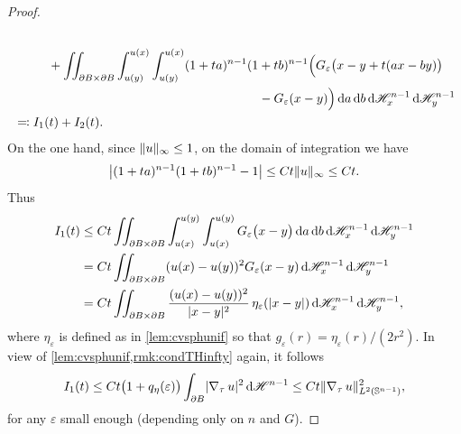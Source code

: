 \documentclass[JEP,XML,SOM,Unicode,published]{cedram}
\numberwithin{equation}{section}
\theoremstyle{plain}
\theoremstyle{definition}
\newcommand{\da}{\mathop{}\mathopen{}\mathrm{d}a}
\newcommand{\db}{\mathop{}\mathopen{}\mathrm{d}b}
\newcommand{\dH}{\mathop{}\mathopen{}\mathrm{d}\mathscr{H}}
\newcommand{\bbS}{\mathbb{S}}
\let\eps\varepsilon
\newcommand{\grad}{\nabla}
\DeclarePairedDelimiter{\abs}{\lvert}{\rvert}
\DeclarePairedDelimiter{\norm}{\lVert}{\rVert}
\begin{document}
\begin{proof}
\begin{multline}
\begin{aligned}
\begin{multlined}
\end{multlined}\\
&\begin{multlined}\hphantom{=\iint}
+\iint_{\partial B\times\partial B} \int_{u(y)}^{u(x)}\int_{u(y)}^{u(x)}
(1+ta)^{n-1}(1+tb)^{n-1}\Big(G_\eps\big(x-y+t(ax-by)\big)\\-G_\eps(x-y)\Big)
\da\db\dH^{n-1}_x\dH^{n-1}_y\end{multlined}\\
&\eqqcolon I_1(t)+I_2(t).
\end{aligned}
\end{multline}
On the one hand, since $\norm{u}_\infty\leq 1$, on the domain of integration we have
\[
\abs*{(1+ta)^{n-1}(1+tb)^{n-1}-1}
\leq Ct\norm{u}_{\infty}
\leq Ct.
\]
Thus
\[
\begin{aligned}
I_1(t)
&\leq Ct\iint_{\partial B\times\partial B} \int_{u(x)}^{u(y)}\int_{u(x)}^{u(y)}
G_\eps\big(x-y\big)\da\db\dH_x^{n-1}\dH_y^{n-1}\\
&= Ct\iint_{\partial B\times\partial B} (u(x)-u(y))^2 G_{\eps}(x-y)\dH_x^{n-1}\dH_y^{n-1}\\
&= Ct\iint_{\partial B\times\partial B} \frac{(u(x)-u(y))^2}{\abs{x-y}^2}\,
\eta_{\eps}(\abs{x-y})\dH_x^{n-1}\dH_y^{n-1},
\end{aligned}
\]
where $\eta_\eps$ is defined as in \cref{lem:cvsphunif} so that
$g_\eps(r)=\eta_\eps(r)/(2r^2)$.
In view of \cref{lem:cvsphunif,rmk:condTHinfty} again, it follows
\begin{equation}\label{fuglede:eq5}
\begin{aligned}
I_1(t)
\leq Ct \big(1+q_\eta(\eps)\big)\int_{\partial B} \abs{\grad_\tau\, u}^2\dH^{n-1}
\leq Ct \norm{\grad_\tau\,u}_{L^2(\bbS^{n-1})}^2,
\end{aligned}
\end{equation}
for any $\eps$ small enough (depending only on $n$ and $G$).


\end{proof}
\end{document}
